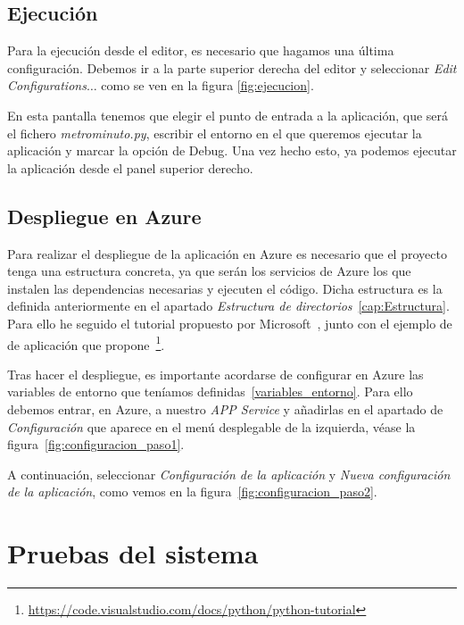 \subsection{Ejecución}
Para la ejecución desde el editor, es necesario que hagamos una última configuración. Debemos ir a la parte superior derecha del editor y seleccionar \textit{Edit Configurations$\dots$} como se ven en la figura \ref{fig:ejecucion}.

En esta pantalla tenemos que elegir el punto de entrada a la aplicación, que será el fichero \textit{metrominuto.py}, escribir el entorno en el que queremos ejecutar la aplicación y marcar la opción de Debug. Una vez hecho esto, ya podemos ejecutar la aplicación desde el panel superior derecho.

\subsection{Despliegue en Azure}
Para realizar el despliegue de la aplicación en Azure es necesario que el proyecto tenga una estructura concreta, ya que serán los servicios de Azure los que instalen las dependencias necesarias y ejecuten el código. Dicha estructura es la definida anteriormente en el apartado \textit{Estructura de directorios}~\ref{cap:Estructura}. Para ello he seguido el tutorial propuesto por Microsoft~\cite{deploy-flask-azure}, junto con el ejemplo de de aplicación que propone~\footnote{\url{https://code.visualstudio.com/docs/python/python-tutorial}}.

Tras hacer el despliegue, es importante acordarse de configurar en Azure las variables de entorno que teníamos definidas~\ref{variables_entorno}. Para ello debemos entrar, en Azure, a nuestro \textit{APP Service} y añadirlas en el apartado de \textit{Configuración} que aparece en el menú desplegable de la izquierda,  véase la figura~\ref{fig:configuracion_paso1}.

A continuación, seleccionar \textit{Configuración de la aplicación} y \textit{Nueva configuración de la aplicación}, como vemos en la figura~\ref{fig:configuracion_paso2}.

\section{Pruebas del sistema}
